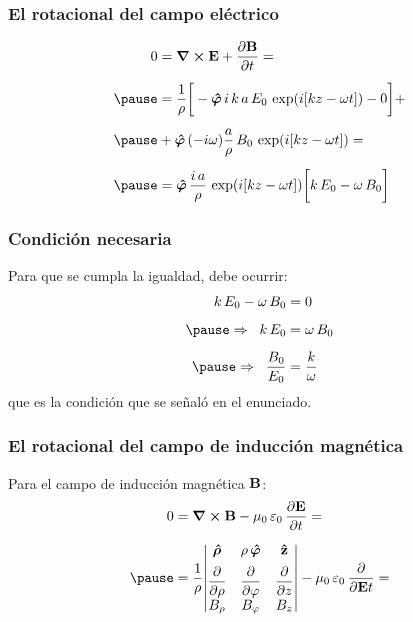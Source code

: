 \documentclass[12pt]{beamer}
\begin{document}
\begin{frame}
\frametitle{El rotacional del campo eléctrico}
\begin{eqnarray*}
\begin{aligned}
0 &= \curl{\vb{E}} + \pdv{\vb{B}}{t} = \\[0.5em] \pause
&= \dfrac{1}{\rho} \bigg[ - \vu{\bm{\varphi}} \, i \, k \, a \, E_{0} \, \exp(i [k z - \omega t]) - 0 \bigg] + \\[0.5em] \pause
&+ \vu{\bm{\varphi}} \, (- i \omega) \dfrac{a}{\rho} \, B_{0} \, \exp(i [k z - \omega t]) = \\[0.5em] \pause
&= \vu{\bm{\varphi}} \, \dfrac{i \, a}{\rho} \, \exp(i [k z - \omega t]) \bigg[ k \, E_{0} - \omega \, B_{0} \bigg]
\end{aligned}
\end{eqnarray*}
\end{frame}
\begin{frame}
\frametitle{Condición necesaria}
Para que se cumpla la igualdad, debe ocurrir:
\pause
\begin{eqnarray*}
\begin{aligned}
k \, E_{0} - \omega \, B_{0} &= 0 \\[0.5em] \pause
\Rightarrow \hspace{0.2cm} k \, E_{0} &= \omega \, B_{0} \\[0.5em] \pause
\Rightarrow \hspace{0.2cm} \dfrac{B_{0}}{E_{0}} &= \dfrac{k}{\omega}
\end{aligned}
\end{eqnarray*}
que es la condición que se señaló en el enunciado.
\end{frame}
\begin{frame}
\frametitle{El rotacional del campo de inducción magnética}
Para el campo de inducción magnética $\vb{B}$:
\pause
\begin{eqnarray*}
\begin{aligned}
0 &= \curl{\vb{B}} - \mu_{0} \, \varepsilon_{0} \, \pdv{\vb{E}}{t} = \\[0.5em] \pause
&= \dfrac{1}{\rho} \mqty|
\vu{\bm{\rho}} & \rho \, \vu{\bm{\varphi}} & \vu{z} \\[0.5em]
\displaystyle \pdv{\rho} & \displaystyle  \pdv{\varphi} & \displaystyle \pdv{z} \\[0.5em]
B_{\rho} & B_{\varphi} & B_{z} | - \mu_{0} \, \varepsilon_{0} \, \pdv{\vb{E}{t}} = 
\end{aligned}
\end{eqnarray*}
\end{frame}
\end{document}
